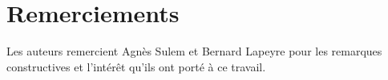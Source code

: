 \section*{Remerciements}

Les auteurs remercient Agn\`es Sulem et Bernard Lapeyre 
pour les remarques constructives et l'int\'er\^et qu'ils 
ont port\'e \`a ce travail.

